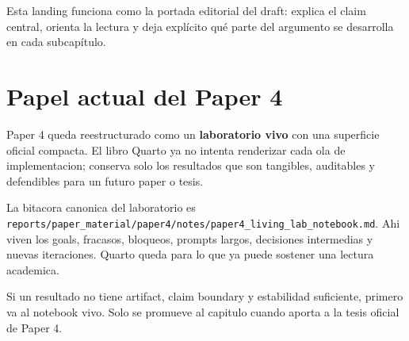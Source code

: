 \documentclass[
  spanish,
  11pt,
  letterpaper,
]{scrbook}
\theoremstyle{plain}
\theoremstyle{remark}
\begin{document}
\begin{tcolorbox}[enhanced jigsaw, arc=.35mm, bottomrule=.15mm, bottomtitle=1mm, breakable, colback=white, colbacktitle=quarto-callout-important-color!10!white, colframe=quarto-callout-important-color-frame, coltitle=black, left=2mm, leftrule=.75mm, opacityback=0, opacitybacktitle=0.6, rightrule=.15mm, title=\textcolor{quarto-callout-important-color}{\faExclamation}\hspace{0.5em}{Paper autocontenido}, titlerule=0mm, toprule=.15mm, toptitle=1mm]

Esta landing funciona como la portada editorial del draft: explica el
claim central, orienta la lectura y deja explícito qué parte del
argumento se desarrolla en cada subcapítulo.

\end{tcolorbox}

\section{Papel actual del Paper 4}\label{sec-paper4-mega-extension}

Paper 4 queda reestructurado como un \textbf{laboratorio vivo} con una
superficie oficial compacta. El libro Quarto ya no intenta renderizar
cada ola de implementacion; conserva solo los resultados que son
tangibles, auditables y defendibles para un futuro paper o tesis.

La bitacora canonica del laboratorio es
\texttt{reports/paper\_material/paper4/notes/paper4\_living\_lab\_notebook.md}.
Ahi viven los goals, fracasos, bloqueos, prompts largos, decisiones
intermedias y nuevas iteraciones. Quarto queda para lo que ya puede
sostener una lectura academica.

\begin{tcolorbox}[enhanced jigsaw, arc=.35mm, bottomrule=.15mm, bottomtitle=1mm, breakable, colback=white, colbacktitle=quarto-callout-note-color!10!white, colframe=quarto-callout-note-color-frame, coltitle=black, left=2mm, leftrule=.75mm, opacityback=0, opacitybacktitle=0.6, rightrule=.15mm, title=\textcolor{quarto-callout-note-color}{\faInfo}\hspace{0.5em}{Regla editorial}, titlerule=0mm, toprule=.15mm, toptitle=1mm]

Si un resultado no tiene artifact, claim boundary y estabilidad
suficiente, primero va al notebook vivo. Solo se promueve al capitulo
cuando aporta a la tesis oficial de Paper 4.

\end{tcolorbox}
\end{document}
